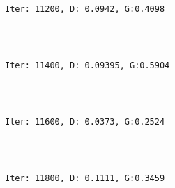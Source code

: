 \documentclass[11pt]{article}
\begin{document}
    \begin{center}
    \end{center}
    { \hspace*{\fill} \\}
    
    \begin{Verbatim}[commandchars=\\\{\}]

Iter: 11200, D: 0.0942, G:0.4098
    \end{Verbatim}

    \begin{center}
    \end{center}
    { \hspace*{\fill} \\}
    
    \begin{Verbatim}[commandchars=\\\{\}]

Iter: 11400, D: 0.09395, G:0.5904
    \end{Verbatim}

    \begin{center}
    \end{center}
    { \hspace*{\fill} \\}
    
    \begin{Verbatim}[commandchars=\\\{\}]

Iter: 11600, D: 0.0373, G:0.2524
    \end{Verbatim}

    \begin{center}
    \end{center}
    { \hspace*{\fill} \\}
    
    \begin{Verbatim}[commandchars=\\\{\}]

Iter: 11800, D: 0.1111, G:0.3459
    \end{Verbatim}

    \begin{center}
    \end{center}
    { \hspace*{\fill} \\}
    
\end{document}
